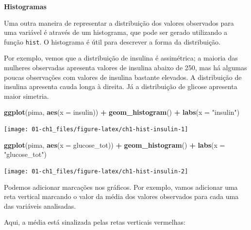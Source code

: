 \documentclass[
]{book}
\newenvironment{Shaded}{\begin{snugshade}}{\end{snugshade}}
\newcommand{\CommentTok}[1]{\textcolor[rgb]{0.56,0.35,0.01}{\textit{#1}}}
\newcommand{\DataTypeTok}[1]{\textcolor[rgb]{0.13,0.29,0.53}{#1}}
\newcommand{\KeywordTok}[1]{\textcolor[rgb]{0.13,0.29,0.53}{\textbf{#1}}}
\newcommand{\NormalTok}[1]{#1}
\newcommand{\OperatorTok}[1]{\textcolor[rgb]{0.81,0.36,0.00}{\textbf{#1}}}
\newcommand{\OtherTok}[1]{\textcolor[rgb]{0.56,0.35,0.01}{#1}}
\newcommand{\StringTok}[1]{\textcolor[rgb]{0.31,0.60,0.02}{#1}}
\theoremstyle{definition}
\theoremstyle{definition}
\theoremstyle{definition}
\theoremstyle{remark}
\begin{document}
\textbf{Histogramas}

Uma outra maneira de representar a distribuição dos valores observados para uma variável é através de um histograma, que pode ser gerado utilizando a função \texttt{hist}. O histograma é útil para descrever a forma da distribuição.

Por exemplo, vemos que a distribuição de insulina é assimétrica; a maioria das mulheres observadas apresenta valores de insulina abaixo de 250, mas há algumas poucas observações com valores de insulina bastante elevados. A distribuição de insulina apresenta cauda longa à direita. Já a distribuição de glicose apresenta maior simetria.

\begin{Shaded}
\begin{Highlighting}[]
\KeywordTok{ggplot}\NormalTok{(pima, }\KeywordTok{aes}\NormalTok{(}\DataTypeTok{x =}\NormalTok{ insulin)) }\OperatorTok{+}
\StringTok{  }\KeywordTok{geom_histogram}\NormalTok{() }\OperatorTok{+}
\StringTok{  }\KeywordTok{labs}\NormalTok{(}\DataTypeTok{x =} \StringTok{"insulin"}\NormalTok{)}
\end{Highlighting}
\end{Shaded}

\texttt{[image: 01-ch1\_files/figure-latex/ch1-hist-insulin-1]}

\begin{Shaded}
\begin{Highlighting}[]
\KeywordTok{ggplot}\NormalTok{(pima, }\KeywordTok{aes}\NormalTok{(}\DataTypeTok{x =}\NormalTok{ glucose_tot)) }\OperatorTok{+}
\StringTok{  }\KeywordTok{geom_histogram}\NormalTok{() }\OperatorTok{+}
\StringTok{  }\KeywordTok{labs}\NormalTok{(}\DataTypeTok{x =} \StringTok{"glucose_tot"}\NormalTok{)}
\end{Highlighting}
\end{Shaded}

\texttt{[image: 01-ch1\_files/figure-latex/ch1-hist-insulin-2]}

Podemos adicionar marcações nos gráficos. Por exemplo, vamos adicionar uma reta vertical marcando o valor da média dos valores observados para cada uma das variáveis analisadas.

Aqui, a média está sinalizada pelas retas verticais vermelhas:

\begin{Shaded}
\end{Shaded}
\end{document}
